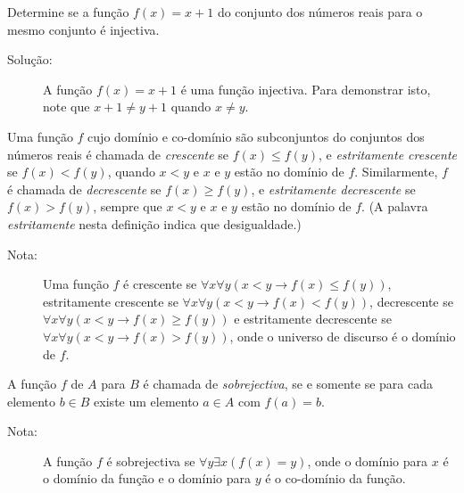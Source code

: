 \begin{exmp}

Determine se a função $f(x)=x+1$ do conjunto dos números reais para o mesmo
conjunto é injectiva.
\begin{description}
\item[Solução:]A função $f(x)=x+1$ é uma função injectiva. Para demonstrar isto,
note que $x+1 \neq y+1$ quando $x \neq y$.
\end{description}
\end{exmp}

\begin{defn}
\label{def321}
Uma função $f$ cujo domínio e co-domínio são subconjuntos do conjuntos dos
números reais é chamada de \emph{crescente} se $f(x) \leq f(y)$, e
\emph{estritamente crescente} se $f(x) < f(y)$, quando $x<y$ e $x$ e $y$ estão
no domínio de $f$.
Similarmente, $f$ é chamada de \emph{decrescente} se $f(x) \geq f(y)$, e
\emph{estritamente decrescente} se $f(x) > f(y)$, sempre que $x<y$ e $x$ e $y$
estão no domínio de $f$. (A palavra \emph{estritamente} nesta definição indica
que desigualdade.)
\end{defn}

\begin{description}
\item[Nota:]Uma função $f$ é crescente se $\forall x\forall y(x<y \to f(x) \leq
f(y))$, estritamente crescente se $\forall x\forall y(x<y \to f(x) < f(y))$,
decrescente se $\forall x\forall y(x<y \to f(x) \geq f(y))$ e estritamente
decrescente se $\forall x\forall y(x<y \to f(x) > f(y))$, onde o universo de
discurso é o domínio de $f$.
\end{description}

\begin{defn}
\label{def322}
A função $f$ de $A$ para $B$ é chamada de \emph{sobrejectiva}, se e somente se
para cada elemento $b \in B$ existe um elemento $a \in A$ com $f(a)=b$.

\begin{description}
\item[Nota:]A função $f$ é sobrejectiva se $\forall y\exists x(f(x)=y)$, onde o
domínio para $x$ é o domínio da função e o domínio para $y$ é o co-domínio da
função.
\end{description}
\end{defn}

